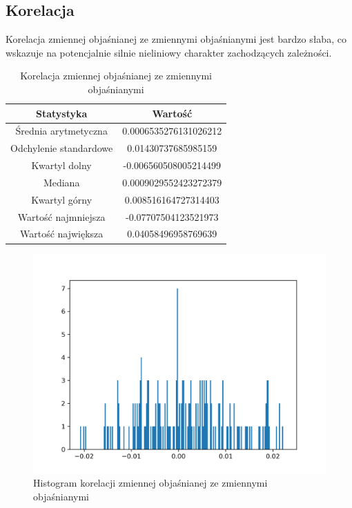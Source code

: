 \documentclass{article}
\begin{document}
\newpage
\subsection{Korelacja}
Korelacja zmiennej objaśnianej ze zmiennymi objaśnianymi jest bardzo słaba, co wskazuje na potencjalnie silnie nieliniowy charakter zachodzących zależności.
\begin{table}[h!]
    \begin{center}
    \begin{tabular}{|c | c|} 
    \hline
    Statystyka & Wartość \\
    \hline\hline
    Średnia arytmetyczna & 0.0006535276131026212 \\ 
    \hline
    Odchylenie standardowe & 0.01430737685985159 \\
    \hline
    Kwartyl dolny & -0.006560508005214499 \\
    \hline
    Mediana & 0.0009029552423272379 \\
    \hline
    Kwartyl górny & 0.008516164727314403 \\
    \hline
    Wartość najmniejsza & -0.07707504123521973 \\
    \hline
    Wartość największa & 0.04058496958769639 \\
    \hline
    \end{tabular}
    \end{center}
   \caption{Korelacja zmiennej objaśnianej ze zmiennymi objaśnianymi}
\end{table}

\begin{figure}[h!]
    \includegraphics[width=\linewidth]{source/CorrHist.png}
    \caption{Histogram korelacji zmiennej objaśnianej ze zmiennymi objaśnianymi}
\end{figure}
\end{document}
